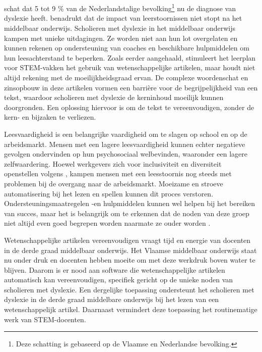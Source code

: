\section{}%
\label{sec:probleemstelling}

\textcite{Ghesquiere2018} schat dat 5 tot 9 \% van de Nederlandstalige bevolking\footnote{Deze schatting is gebaseerd op de Vlaamse en Nederlandse bevolking.} nu de diagnose van dyslexie heeft. \textcite{Lissens2020} benadrukt dat de impact van leerstoornissen niet stopt na het middelbaar onderwijs. Scholieren met dyslexie in het middelbaar onderwijs kampen met unieke uitdagingen. Ze worden niet aan hun lot overgelaten en kunnen rekenen op ondersteuning van coaches en beschikbare hulpmiddelen om hun leesachterstand te beperken. Zoals eerder aangehaald, stimuleert het leerplan voor STEM-vakken het gebruik van wetenschappelijke artikelen, maar houdt niet altijd rekening met de moeilijkheidsgraad ervan. De complexe woordenschat en zinsopbouw in deze artikelen vormen een barrière voor de begrijpelijkheid van een tekst, waardoor scholieren met dyslexie de kerninhoud moeilijk kunnen doorgronden. Een oplossing hiervoor is om de tekst te vereenvoudigen, zonder de kern- en bijzaken te verliezen.

Leesvaardigheid is een belangrijke vaardigheid om te slagen op school en op de arbeidsmarkt. Mensen met een lagere leesvaardigheid kunnen echter negatieve gevolgen ondervinden op hun psychosociaal welbevinden, waaronder een lagere zelfwaardering. Hoewel werkgevers zich voor inclusiviteit en diversiteit openstellen volgens \textcite{Lissens2020}, kampen mensen met een leesstoornis nog steeds met problemen bij de overgang naar de arbeidsmarkt. Moeizame en stroeve automatisering bij het lezen en spellen kunnen dit proces verstoren. Ondersteuningsmaatregelen -en hulpmiddelen kunnen wel helpen bij het bereiken van succes, maar het is belangrijk om te erkennen dat de noden van deze groep niet altijd even goed begrepen worden naarmate ze ouder worden \autocite{Lissens2020}. %

Wetenschappelijke artikelen vereenvoudigen vraagt tijd en energie van docenten in de derde graad middelbaar onderwijs. Het Vlaamse middelbaar onderwijs staat nu onder druk en docenten hebben moeite om met deze werkdruk boven water te blijven. Daarom is er nood aan software die wetenschappelijke artikelen automatisch kan vereenvoudigen, specifiek gericht op de unieke noden van scholieren met dyslexie. Een dergelijke toepassing ondersteunt het scholieren met dyslexie in de derde graad middelbare onderwijs bij het lezen van een wetenschappelijk artikel. Daarnaast vermindert deze toepassing het routinematige werk van STEM-docenten.

